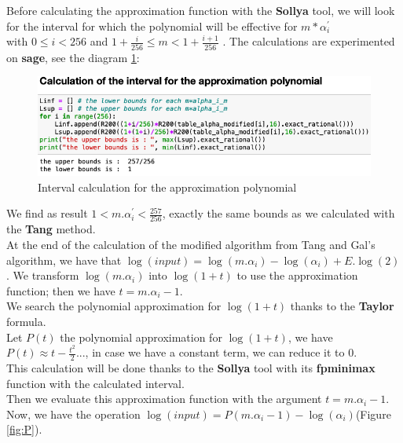 Before calculating the approximation function with the \textbf{Sollya} tool, we will look for the interval for which the polynomial will be effective
for $m*\alpha^{'}_i$\\ with $0\le i<256$ and $1+\frac{i}{256}\le m < 1+\frac{i+1}{256}$ .
The calculations are experimented on \textbf{sage}, see the diagram \ref{fig:poly}:
\begin{figure}[H]
    \centering
    \includegraphics[scale = 0.49]{images/notre_met_Tang_Gal/calcul_intervalle.png}
    \caption{Interval calculation for the approximation polynomial }\label{fig:poly}
\end{figure}
We find as result $1 < m.\alpha^{'}_i < \frac{257}{256}$, exactly the same bounds as we calculated with the \textbf{Tang} method.\\
At the end of the calculation of the modified algorithm  from Tang and Gal's algorithm, we have that $\log(input) = \log(m.\alpha_i) - \log(\alpha_i) + E.\log( 2)$. We transform $ \log(m.\alpha_i)$ into $\log(1+t)$ to use the approximation function; then we have $t = m.\alpha_i-1$.\\
We search the polynomial approximation for $\log(1+t)$ thanks to the \textbf{Taylor} formula.\\ 
Let $P(t)$ the polynomial approximation for $\log(1+t)$, we have $P(t) \approx t - \frac{t^2}{2}...$, in case we have a constant term, we can reduce it to $0$.\\
This calculation  will be done thanks to the \textbf{Sollya} tool with its \textbf{fpminimax} function with the calculated interval.\\
Then we evaluate this approximation function with the argument $t = m.\alpha_i-1$.\\
Now, we have the operation $\log(input) = P(m.\alpha_i-1) - \log(\alpha_i )$(Figure \ref{fig:P}).\\

